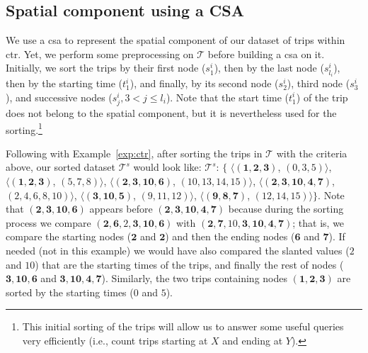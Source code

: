 	\subsection{Spatial component using a CSA}
	\label{sec:transnet_repr}

	We use a \gls{csa} to represent the spatial component of our dataset of trips within \gls{ctr}. Yet,
	we perform some preprocessing on $\mathcal{T}$ before building a \gls{csa} on it. Initially, we 
	sort the trips by their first node ($s^i_1$), then by the last node ($s^i_{l_i}$), then by the starting time
	($t^i_1$), and finally, by its second node ($s^i_2$), third node ($s^i_3$), and successive nodes ($s^i_j, 3<j\leq l_i$). 
	Note that the start time ($t^i_1$) of the trip does not belong to the spatial component, 
	but it is nevertheless used for the sorting.\footnote{This initial sorting of the trips will allow us 
	to answer some useful queries very efficiently  (i.e., count trips starting at $X$ and ending at $Y$).} 

	Following with Example~\ref{exp:ctr}, after sorting the trips in $\mathcal{T}$ with the criteria above, 
	our sorted dataset $\mathcal{T}^s$ would look like: 
	$\mathcal{T}^s$: $\{$%
	$\langle (\mathbf{1,2,3     })$, $(\mathit{0,3,5})                     \rangle$, 
	$\langle (\mathbf{1,2,3     })$, $(\mathit{5,7,8})                     \rangle$, 
	$\langle (\mathbf{2,3,10,6  })$, $(\mathit{10,13,14,15})           \rangle$, 
	$\langle (\mathbf{2,3,10,4,7})$, $(\mathit{2,4,6,8,10}) \rangle$, 
	$\langle (\mathbf{3,10,5    })$, $(\mathit{9,11,12})                     \rangle$, 
	$\langle (\mathbf{9,8,7     })$, $(\mathit{12,14,15})                    \rangle$$\}$. 
	Note that  $ (\mathbf{2,3,10,6  })$ appears before $(\mathbf{2,3,10,4,7})$ because
	during the sorting process we compare $ (\mathbf{2,6,\mathit{2},3, 10,6  })$ with $ (\mathbf{2,7,\mathit{10},3, 10,4,7})$;
	that is, we compare the starting nodes ($\mathbf{2}$ and $\mathbf{2}$) and then the ending nodes ($\mathbf{6}$ and $\mathbf{7}$).
	If needed  (not in this example) we would have also compared the slanted values ($\mathit{2}$ and $\mathit{10}$) 
	that are the starting times of the trips, and finally the rest of nodes  ($ \mathbf{3, 10,6  }$ and $ \mathbf{3, 10,4,7}$).
	Similarly, the two trips containing nodes $ (\mathbf{1,2,3})$ are sorted by the starting times ($\mathit{0}$ and $\mathit{5}$).


